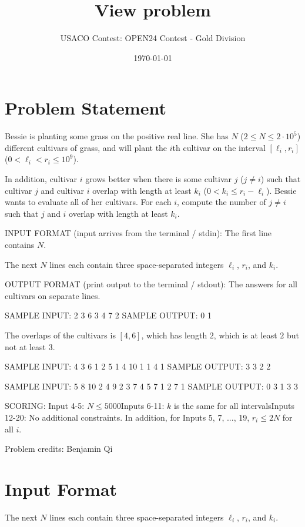 \documentclass[12pt]{article}
\title{View problem}
\author{USACO Contest: OPEN24 Contest - Gold Division}
\date{\today}
\begin{document}
\maketitle

\section*{Problem Statement}


Bessie is planting some grass on the positive real line. She has $N$
($2\le N\le 2\cdot 10^5$) different cultivars of grass,  and will plant the
$i$th cultivar on the interval $[\ell_i, r_i]$ ($0 < \ell_i < r_i \leq 10^9$).

In addition, cultivar $i$ grows better when there is some cultivar $j$
($j\neq i$) such that  cultivar $j$ and cultivar $i$ overlap with length at
least $k_i$ ($0 < k_i \leq r_i - \ell_i$). Bessie wants to evaluate all of her
cultivars.  For each $i$, compute the number of $j\neq i$ such that $j$ and $i$
overlap with length at least $k_i$.

INPUT FORMAT (input arrives from the terminal / stdin):
The first line contains $N$.

The next $N$ lines each contain three space-separated integers $\ell_i$, $r_i$,
and
$k_i$.

OUTPUT FORMAT (print output to the terminal / stdout):
The answers for all cultivars on separate lines.

SAMPLE INPUT:
2
3 6 3
4 7 2
SAMPLE OUTPUT: 
0
1

The overlaps of the cultivars is $[4,6]$, which has length $2$, which is at
least $2$ but not at least $3$.

SAMPLE INPUT:
4
3 6 1
2 5 1
4 10 1
1 4 1
SAMPLE OUTPUT: 
3
3
2
2

SAMPLE INPUT:
5
8 10 2
4 9 2
3 7 4
5 7 1
2 7 1
SAMPLE OUTPUT: 
0
3
1
3
3

SCORING:
Input 4-5: $N \leq 5000$Inputs 6-11: $k$ is the same for all intervalsInputs 12-20: No additional constraints.
In addition, for Inputs 5, 7, ..., 19, $r_i \leq 2N$ for all $i$.



Problem credits: Benjamin Qi



\section*{Input Format}
The next $N$ lines each contain three space-separated integers $\ell_i$, $r_i$,
and
$k_i$.
\end{document}
